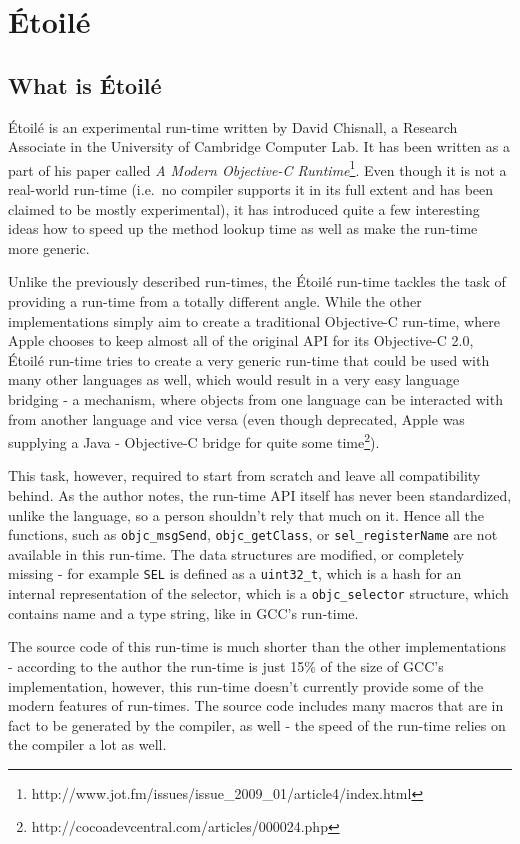 \chapter{\'Etoil\'e}
\section{What is \'Etoil\'e}

\'Etoil\'e is an experimental run-time written by David Chisnall, a Research Associate in the University of Cambridge Computer Lab. It has been written as a part of his paper called \emph{A Modern Objective-C Runtime}\footnote{http://www.jot.fm/issues/issue\_2009\_01/article4/index.html}. Even though it is not a real-world run-time (i.e.\ no compiler supports it in its full extent and has been claimed to be mostly experimental), it has introduced quite a few interesting ideas how to speed up the method lookup time as well as make the run-time more generic.

Unlike the previously described run-times, the \'Etoil\'e run-time tackles the task of providing a run-time from a totally different angle. While the other implementations simply aim to create a traditional Objective-C run-time, where Apple chooses to keep almost all of the original API for its Objective-C 2.0, \'Etoil\'e run-time tries to create a very generic run-time that could be used with many other languages as well, which would result in a very easy language bridging - a mechanism, where objects from one language can be interacted with from another language and vice versa (even though deprecated, Apple was supplying a Java - Objective-C bridge for quite some time\footnote{http://cocoadevcentral.com/articles/000024.php}).

This task, however, required to start from scratch and leave all compatibility behind. As the author notes, the run-time API itself has never been standardized, unlike the language, so a person shouldn't rely that much on it. Hence all the functions, such as \verb=objc_msgSend=, \verb=objc_getClass=, or \verb=sel_registerName= are not available in this run-time. The data structures are modified, or completely missing - for example \verb=SEL= is defined as a \verb=uint32_t=, which is a hash for an internal representation of the selector, which is a \verb=objc_selector= structure, which contains name and a type string, like in GCC's run-time. 

The source code of this run-time is much shorter than the other implementations - according to the author the run-time is just 15\% of the size of GCC's implementation, however, this run-time doesn't currently provide some of the modern features of run-times. The source code includes many macros that are in fact to be generated by the compiler, as well - the speed of the run-time relies on the compiler a lot as well.

